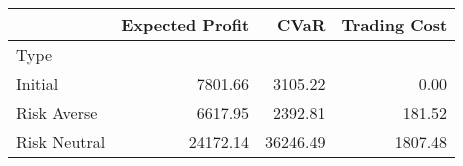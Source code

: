\begin{tabular}{lrrr}
\toprule
{} &  Expected Profit &      CVaR &  Trading Cost \\
\midrule
Type         &                  &           &               \\
Initial      &          7801.66 &   3105.22 &          0.00 \\
Risk Averse  &          6617.95 &   2392.81 &        181.52 \\
Risk Neutral &         24172.14 &  36246.49 &       1807.48 \\
\bottomrule
\end{tabular}
